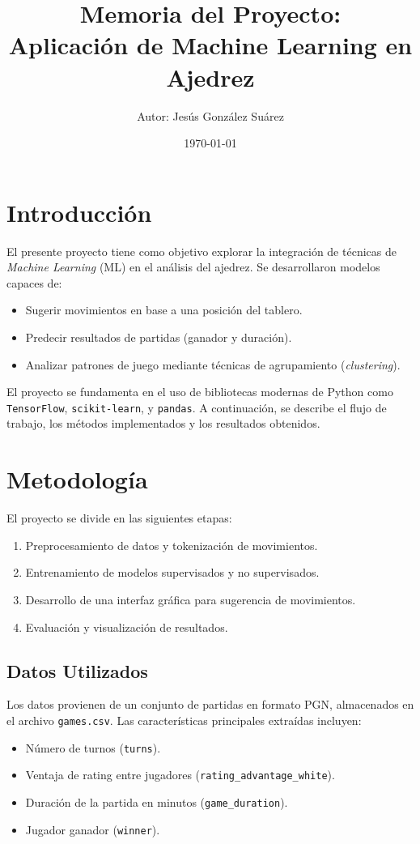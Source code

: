 \documentclass[a4paper,12pt]{article}
\title{
    \vspace{4cm} %
    \textbf{\Huge Memoria del Proyecto: \\ Aplicación de Machine Learning en Ajedrez} %
}
\author{\Large Autor: Jesús González Suárez} %
\date{\today} %
\begin{document}
\maketitle
\newpage

\tableofcontents
\newpage
\listoffigures
\newpage

\section{Introducción}

El presente proyecto tiene como objetivo explorar la integración de técnicas de \textit{Machine Learning} (ML) en el análisis del ajedrez. Se desarrollaron modelos capaces de:
\begin{itemize}
    \item Sugerir movimientos en base a una posición del tablero.
    \item Predecir resultados de partidas (ganador y duración).
    \item Analizar patrones de juego mediante técnicas de agrupamiento (\textit{clustering}).
\end{itemize}

El proyecto se fundamenta en el uso de bibliotecas modernas de Python como \texttt{TensorFlow}, \texttt{scikit-learn}, y \texttt{pandas}. A continuación, se describe el flujo de trabajo, los métodos implementados y los resultados obtenidos.

\section{Metodología}

El proyecto se divide en las siguientes etapas:
\begin{enumerate}
    \item Preprocesamiento de datos y tokenización de movimientos.
    \item Entrenamiento de modelos supervisados y no supervisados.
    \item Desarrollo de una interfaz gráfica para sugerencia de movimientos.
    \item Evaluación y visualización de resultados.
\end{enumerate}

\subsection{Datos Utilizados}

Los datos provienen de un conjunto de partidas en formato PGN, almacenados en el archivo \texttt{games.csv}. Las características principales extraídas incluyen:
\begin{itemize}
    \item Número de turnos (\texttt{turns}).
    \item Ventaja de rating entre jugadores (\texttt{rating\_advantage\_white}).
    \item Duración de la partida en minutos (\texttt{game\_duration}).
    \item Jugador ganador (\texttt{winner}).
\end{itemize}
\end{document}
